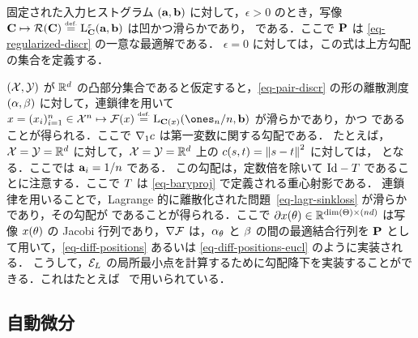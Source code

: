\begin{proposition}[費用に関する導関数]
固定された入力ヒストグラム $(\a,\b)$ に対して，$\epsilon>0$ のとき，写像 $\C \mapsto \Rr(\C) \eqdef \MKD_\C^\epsilon(\a,\b)$ は凹かつ滑らかであり，
\eql{\label{eq-diff-cost}
	\nabla \Rr(\C) = \P,
}
である．ここで $\P$ は \eqref{eq-regularized-discr} の一意な最適解である．
%
$\epsilon=0$ に対しては，この式は上方勾配の集合を定義する．
\end{proposition}



$(\X,\Y)$ が $\RR^\dim$ の凸部分集合であると仮定すると，\eqref{eq-pair-discr} の形の離散測度 $(\al,\be)$ に対して，連鎖律を用いて $x = (x_i)_{i=1}^n  \in \X^n \mapsto \Ff(x) \eqdef  \MKD_{\C(x)}(\ones_n/n,\b)$ が滑らかであり，かつ
であることが得られる．ここで $\nabla_1 \c$ は第一変数に関する勾配である．
%
たとえば，$\X=\Y=\RR^d$ に対して，$\X=\Y=\RR^d$ 上の $\c(s,t) = \norm{s-t}^2$ に対しては，
となる．ここでは $\a_i=1/n$ である．
%
この勾配は，定数倍を除いて $\Id-\T$ であることに注意する．ここで $\T$ は \eqref{eq-baryproj} で定義される重心射影である．
%
連鎖律を用いることで，Lagrange 的に離散化された問題~\eqref{eq-lagr-sinkloss} が滑らかであり，その勾配が
であることが得られる．ここで $\partial x(\th) \in \RR^{\text{dim}(\Theta) \times (n\dim)}$ は写像 $x(\th)$ の Jacobi 行列であり，$\nabla \Ff$ は，$\al_\th$ と $\be$ の間の最適結合行列を $\P$ として用いて，\eqref{eq-diff-positions} あるいは \eqref{eq-diff-positions-eucl} のように実装される．
%
こうして，$\Ee_L$ の局所最小点を計算するために勾配降下を実装することができる．これはたとえば~\citep{CuturiBarycenter} で用いられている．

\subsection{自動微分}
\label{rem-auto-diff}

